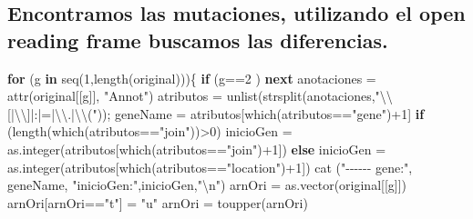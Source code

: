 \documentclass[
]{article}
\newenvironment{Shaded}{\begin{snugshade}}{\end{snugshade}}
\newcommand{\ControlFlowTok}[1]{\textcolor[rgb]{0.13,0.29,0.53}{\textbf{#1}}}
\newcommand{\DecValTok}[1]{\textcolor[rgb]{0.00,0.00,0.81}{#1}}
\newcommand{\FunctionTok}[1]{\textcolor[rgb]{0.00,0.00,0.00}{#1}}
\newcommand{\NormalTok}[1]{#1}
\newcommand{\OtherTok}[1]{\textcolor[rgb]{0.56,0.35,0.01}{#1}}
\newcommand{\SpecialCharTok}[1]{\textcolor[rgb]{0.00,0.00,0.00}{#1}}
\newcommand{\StringTok}[1]{\textcolor[rgb]{0.31,0.60,0.02}{#1}}
\begin{document}
\hypertarget{encontramos-las-mutaciones-utilizando-el-open-reading-frame-buscamos-las-diferencias.}{%
\subsection{Encontramos las mutaciones, utilizando el open reading frame
buscamos las
diferencias.}\label{encontramos-las-mutaciones-utilizando-el-open-reading-frame-buscamos-las-diferencias.}}

\begin{Shaded}
\begin{Highlighting}[]
\ControlFlowTok{for}\NormalTok{ (g }\ControlFlowTok{in} \FunctionTok{seq}\NormalTok{(}\DecValTok{1}\NormalTok{,}\FunctionTok{length}\NormalTok{(original)))\{}
  \ControlFlowTok{if}\NormalTok{ (g}\SpecialCharTok{==}\DecValTok{2}\NormalTok{ ) }\ControlFlowTok{next}
\NormalTok{  anotaciones }\OtherTok{=} \FunctionTok{attr}\NormalTok{(original[[g]], }\StringTok{"Annot"}\NormalTok{) }
\NormalTok{  atributos }\OtherTok{=} \FunctionTok{unlist}\NormalTok{(}\FunctionTok{strsplit}\NormalTok{(anotaciones,}\StringTok{"}\SpecialCharTok{\textbackslash{}\textbackslash{}}\StringTok{[|}\SpecialCharTok{\textbackslash{}\textbackslash{}}\StringTok{]|:|=|}\SpecialCharTok{\textbackslash{}\textbackslash{}}\StringTok{.|}\SpecialCharTok{\textbackslash{}\textbackslash{}}\StringTok{("}\NormalTok{)); }
\NormalTok{  geneName }\OtherTok{=}\NormalTok{ atributos[}\FunctionTok{which}\NormalTok{(atributos}\SpecialCharTok{==}\StringTok{"gene"}\NormalTok{)}\SpecialCharTok{+}\DecValTok{1}\NormalTok{] }
  \ControlFlowTok{if}\NormalTok{ (}\FunctionTok{length}\NormalTok{(}\FunctionTok{which}\NormalTok{(atributos}\SpecialCharTok{==}\StringTok{"join"}\NormalTok{))}\SpecialCharTok{\textgreater{}}\DecValTok{0}\NormalTok{) inicioGen }\OtherTok{=} \FunctionTok{as.integer}\NormalTok{(atributos[}\FunctionTok{which}\NormalTok{(atributos}\SpecialCharTok{==}\StringTok{"join"}\NormalTok{)}\SpecialCharTok{+}\DecValTok{1}\NormalTok{]) }
  \ControlFlowTok{else}\NormalTok{ inicioGen }\OtherTok{=} \FunctionTok{as.integer}\NormalTok{(atributos[}\FunctionTok{which}\NormalTok{(atributos}\SpecialCharTok{==}\StringTok{"location"}\NormalTok{)}\SpecialCharTok{+}\DecValTok{1}\NormalTok{]) }
  \FunctionTok{cat}\NormalTok{ (}\StringTok{"{-}{-}{-}{-}{-}{-} gene:"}\NormalTok{, geneName, }\StringTok{"inicioGen:"}\NormalTok{,inicioGen,}\StringTok{"}\SpecialCharTok{\textbackslash{}n}\StringTok{"}\NormalTok{)}
\NormalTok{  arnOri }\OtherTok{=} \FunctionTok{as.vector}\NormalTok{(original[[g]])}
\NormalTok{  arnOri[arnOri}\SpecialCharTok{==}\StringTok{"t"}\NormalTok{] }\OtherTok{=} \StringTok{"u"}
\NormalTok{  arnOri }\OtherTok{=} \FunctionTok{toupper}\NormalTok{(arnOri)}


\end{Highlighting}
\end{Shaded}
\end{document}
